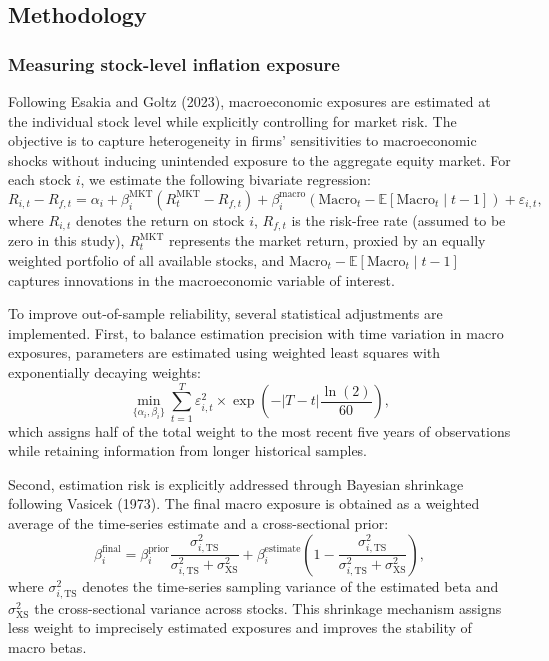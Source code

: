 \documentclass{article}
\begin{document}
\subsection{Methodology}

\subsubsection{Measuring stock-level inflation exposure}

Following Esakia and Goltz (2023), macroeconomic exposures are estimated at the individual stock level while explicitly controlling for market risk. The objective is to capture heterogeneity in firms’ sensitivities to macroeconomic shocks without inducing unintended exposure to the aggregate equity market. For each stock $i$, we estimate the following bivariate regression:
\begin{equation}
R_{i,t} - R_{f,t}
= \alpha_i
+ \beta^{\text{MKT}}_i \left( R^{\text{MKT}}_t - R_{f,t} \right)
+ \beta^{\text{macro}}_i \left( \text{Macro}_t - \mathbb{E}[\text{Macro}_t \mid t-1] \right)
+ \varepsilon_{i,t},
\end{equation}
where $R_{i,t}$ denotes the return on stock $i$, $R_{f,t}$ is the risk-free rate (assumed to be zero in this study), $R^{\text{MKT}}_t$ represents the market return, proxied by an equally weighted portfolio of all available stocks, and $\text{Macro}_t - \mathbb{E}[\text{Macro}_t \mid t-1]$ captures innovations in the macroeconomic variable of interest.

\noindent To improve out-of-sample reliability, several statistical adjustments are implemented. First, to balance estimation precision with time variation in macro exposures, parameters are estimated using weighted least squares with exponentially decaying weights:
\begin{equation}
\min_{\{\alpha_i,\beta_i\}}
\sum_{t=1}^{T} \varepsilon_{i,t}^2
\times \exp\!\left(-|T-t| \frac{\ln(2)}{60}\right),
\end{equation}
which assigns half of the total weight to the most recent five years of observations while retaining information from longer historical samples.

\noindent Second, estimation risk is explicitly addressed through Bayesian shrinkage following Vasicek (1973). The final macro exposure is obtained as a weighted average of the time-series estimate and a cross-sectional prior:
\begin{equation}
\beta^{\text{final}}_i
=
\beta^{\text{prior}}_i
\frac{\sigma^2_{i,\text{TS}}}{\sigma^2_{i,\text{TS}} + \sigma^2_{\text{XS}}}
+
\beta^{\text{estimate}}_i
\left(
1 -
\frac{\sigma^2_{i,\text{TS}}}{\sigma^2_{i,\text{TS}} + \sigma^2_{\text{XS}}}
\right),
\end{equation}
where $\sigma^2_{i,\text{TS}}$ denotes the time-series sampling variance of the estimated beta and $\sigma^2_{\text{XS}}$ the cross-sectional variance across stocks. This shrinkage mechanism assigns less weight to imprecisely estimated exposures and improves the stability of macro betas.
\end{document}
